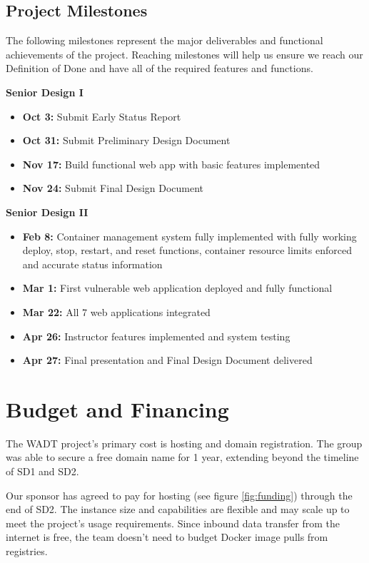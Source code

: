 \documentclass[12pt,titlepage]{article}
\begin{document}
\subsection{Project Milestones}
The following milestones represent the major deliverables and functional achievements of the project. Reaching milestones will help us ensure we reach our Definition of Done and have all of the required features and functions.

\noindent\textbf{Senior Design I}
\begin{itemize}
    \item \textbf{Oct 3:} Submit Early Status Report
    \item \textbf{Oct 31:} Submit Preliminary Design Document
    \item \textbf{Nov 17:} Build functional web app with basic features implemented
    \item \textbf{Nov 24:} Submit Final Design Document
\end{itemize}
\textbf{Senior Design II}
\begin{itemize}
    \item \textbf{Feb 8:} Container management system fully implemented with fully working deploy, stop, restart, and reset functions, container resource limits enforced and accurate status information
    \item \textbf{Mar 1:} First vulnerable web application deployed and fully functional
    \item \textbf{Mar 22:} All 7 web applications integrated
    \item \textbf{Apr 26:} Instructor features implemented and system testing
    \item \textbf{Apr 27:} Final presentation and Final Design Document delivered
\end{itemize}

\section{Budget and Financing}
The WADT project's primary cost is hosting and domain registration. The group was able to secure a free domain name for 1 year, extending beyond the timeline of SD1 and SD2.

Our sponsor has agreed to pay for hosting (see figure \ref{fig:funding}) through the end of SD2. The instance size and capabilities are flexible and may scale up to meet the project's usage requirements. Since inbound data transfer from the internet is free, the team doesn't need to budget Docker image pulls from registries.
\end{document}
